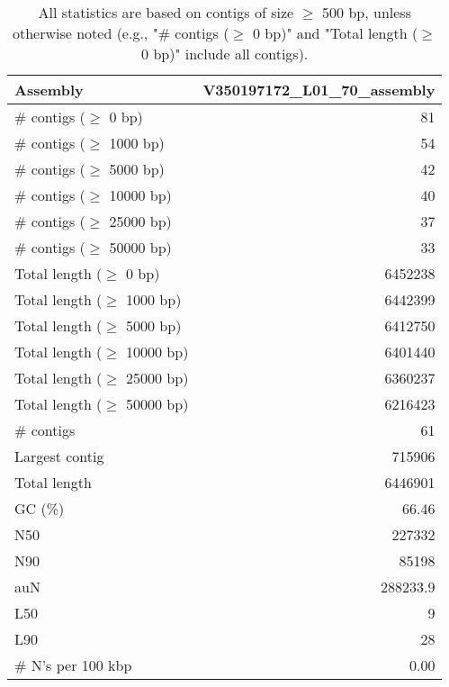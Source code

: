 \documentclass[12pt,a4paper]{article}
\begin{document}
\begin{table}[ht]
\begin{center}
\caption{All statistics are based on contigs of size $\geq$ 500 bp, unless otherwise noted (e.g., "\# contigs ($\geq$ 0 bp)" and "Total length ($\geq$ 0 bp)" include all contigs).}
\begin{tabular}{|l*{1}{|r}|}
\hline
Assembly & V350197172\_L01\_70\_assembly \\ \hline
\# contigs ($\geq$ 0 bp) & 81 \\ \hline
\# contigs ($\geq$ 1000 bp) & 54 \\ \hline
\# contigs ($\geq$ 5000 bp) & 42 \\ \hline
\# contigs ($\geq$ 10000 bp) & 40 \\ \hline
\# contigs ($\geq$ 25000 bp) & 37 \\ \hline
\# contigs ($\geq$ 50000 bp) & 33 \\ \hline
Total length ($\geq$ 0 bp) & 6452238 \\ \hline
Total length ($\geq$ 1000 bp) & 6442399 \\ \hline
Total length ($\geq$ 5000 bp) & 6412750 \\ \hline
Total length ($\geq$ 10000 bp) & 6401440 \\ \hline
Total length ($\geq$ 25000 bp) & 6360237 \\ \hline
Total length ($\geq$ 50000 bp) & 6216423 \\ \hline
\# contigs & 61 \\ \hline
Largest contig & 715906 \\ \hline
Total length & 6446901 \\ \hline
GC (\%) & 66.46 \\ \hline
N50 & 227332 \\ \hline
N90 & 85198 \\ \hline
auN & 288233.9 \\ \hline
L50 & 9 \\ \hline
L90 & 28 \\ \hline
\# N's per 100 kbp & 0.00 \\ \hline
\end{tabular}
\end{center}
\end{table}
\end{document}
